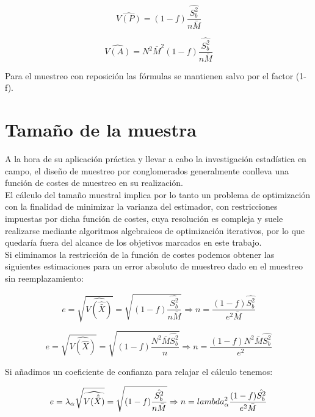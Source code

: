 \begin{equation}
    \widehat{V(P)} = (1-f)\frac{\hat{S_b^2}}{n\bar{M}}
\end{equation}

\begin{equation}
    \widehat{V(A)} = N^2\bar{M}^2(1-f)\frac{\hat{S_b^2}}{n\bar{M}}
\end{equation}

Para el muestreo con reposición las fórmulas se mantienen salvo por el factor (1-f).

\section{Tamaño de la muestra} \label{sect:6.4}

A la hora de su aplicación práctica y llevar a cabo la investigación estadística en campo, el diseño de muestreo por conglomerados generalmente conlleva una función de costes de muestreo en su realización.\\

El cálculo del tamaño muestral implica por lo tanto un problema de optimización con la finalidad de minimizar la varianza del estimador, con restricciones impuestas por dicha función de costes, cuya resolución es compleja y suele realizarse mediante algoritmos algebraicos de optimización iterativos, por lo que quedaría fuera del alcance de los objetivos marcados en este trabajo.\\

Si eliminamos la restricción de la función de costes podemos obtener las siguientes estimaciones para un error absoluto de muestreo dado en el muestreo sin reemplazamiento:

\begin{equation}
    e = \sqrt{\widehat{V(\hat{\bar{X}})}} = \sqrt{(1-f)\frac{\hat{S_b^2}}{n\bar{M}}} \Rightarrow n = \frac{(1-f)\hat{S_b^2}}{e^2\bar{M}}
\end{equation}

\begin{equation}
    e = \sqrt{\widehat{V(\hat{X})}} = \sqrt{(1-f)\frac{N^2\bar{M}\hat{S_b^2}}{n}} \Rightarrow n = \frac{(1-f)N^2\bar{M}\hat{S_b^2}}{e^2}
\end{equation}

Si añadimos un coeficiente de confianza para relajar el cálculo tenemos:

\begin{equation}
    e = \lambda_\alpha\sqrt{\widehat{V(\hat{\bar{X}})}} = \sqrt{(1-f)\frac{\hat{S_b^2}}{n\bar{M}}} \Rightarrow n = \\lambda_\alpha^2\frac{(1-f)\hat{S_b^2}}{e^2\bar{M}}
\end{equation}

